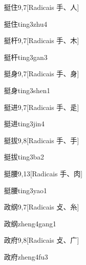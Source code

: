 \begin{entry}{挺住}{9,7}[Radicais ⼿、⼈]
  \begin{phonetics}{挺住}{ting3zhu4}
  \end{phonetics}
\end{entry}

\begin{entry}{挺杆}{9,7}[Radicais ⼿、⽊]
  \begin{phonetics}{挺杆}{ting3gan3}
  \end{phonetics}
\end{entry}

\begin{entry}{挺身}{9,7}[Radicais ⼿、⾝]
  \begin{phonetics}{挺身}{ting3shen1}
  \end{phonetics}
\end{entry}

\begin{entry}{挺进}{9,7}[Radicais ⼿、⾡]
  \begin{phonetics}{挺进}{ting3jin4}
  \end{phonetics}
\end{entry}

\begin{entry}{挺拔}{9,8}[Radicais ⼿、⼿]
  \begin{phonetics}{挺拔}{ting3ba2}
  \end{phonetics}
\end{entry}

\begin{entry}{挺腰}{9,13}[Radicais ⼿、⾁]
  \begin{phonetics}{挺腰}{ting3yao1}
  \end{phonetics}
\end{entry}

\begin{entry}{政纲}{9,7}[Radicais ⽁、⽷]
  \begin{phonetics}{政纲}{zheng4gang1}
  \end{phonetics}
\end{entry}

\begin{entry}{政府}{9,8}[Radicais ⽁、⼴]
  \begin{phonetics}{政府}{zheng4fu3}
  \end{phonetics}
\end{entry}

